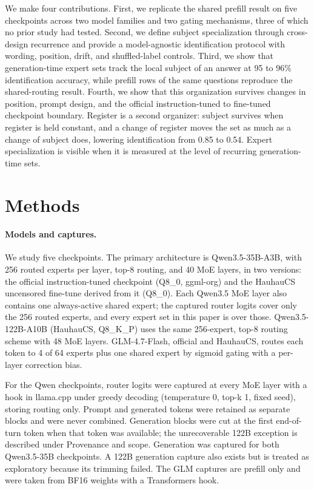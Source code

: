 We make four contributions. First, we replicate the shared prefill result on five checkpoints across two model families and two gating mechanisms, three of which no prior study had tested. Second, we define subject specialization through cross-design recurrence and provide a model-agnostic identification protocol with wording, position, drift, and shuffled-label controls. Third, we show that generation-time expert sets track the local subject of an answer at 95 to 96\% identification accuracy, while prefill rows of the same questions reproduce the shared-routing result. Fourth, we show that this organization survives changes in position, prompt design, and the official instruction-tuned to fine-tuned checkpoint boundary. Register is a second organizer: subject survives when register is held constant, and a change of register moves the set as much as a change of subject does, lowering identification from 0.85 to 0.54. Expert specialization is visible when it is measured at the level of recurring generation-time sets.

\section{Methods}

\paragraph{Models and captures.} We study five checkpoints. The primary architecture is Qwen3.5-35B-A3B, with 256 routed experts per layer, top-8 routing, and 40 MoE layers, in two versions: the official instruction-tuned checkpoint (Q8\_0, ggml-org) and the HauhauCS uncensored fine-tune derived from it (Q8\_0). Each Qwen3.5 MoE layer also contains one always-active shared expert; the captured router logits cover only the 256 routed experts, and every expert set in this paper is over those. Qwen3.5-122B-A10B (HauhauCS, Q8\_K\_P) uses the same 256-expert, top-8 routing scheme with 48 MoE layers. GLM-4.7-Flash, official and HauhauCS, routes each token to 4 of 64 experts plus one shared expert by sigmoid gating with a per-layer correction bias.

For the Qwen checkpoints, router logits were captured at every MoE layer with a hook in llama.cpp under greedy decoding (temperature 0, top-k 1, fixed seed), storing routing only. Prompt and generated tokens were retained as separate blocks and were never combined. Generation blocks were cut at the first end-of-turn token when that token was available; the unrecoverable 122B exception is described under Provenance and scope. Generation was captured for both Qwen3.5-35B checkpoints. A 122B generation capture also exists but is treated as exploratory because its trimming failed. The GLM captures are prefill only and were taken from BF16 weights with a Transformers hook.


